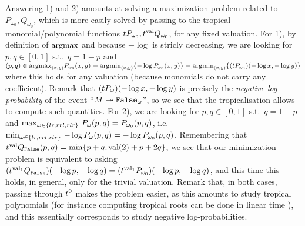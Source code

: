 Answering 1) and 2) amounts at solving a maximization problem related to $P_{\omega_0}, Q_{\omega_0}$, which is more easily solved by 
passing to the tropical monomial/polynomial functions $\trop P_{\omega_0},\trop^{\mathrm{val}} Q_{\omega_0}$, for any fixed valuation.
For 1), by definition of $\mathrm{arg max}$ and because $-\log$ is stricly decreasing, we are looking for $p,q\in[0,1]$ s.t.\ $q=1-p$ and $(p,q)\in
   \RM{arg max}_{(x,y)} P_{\omega_0} (x,y)
   = %
   \RM{arg min}_{(x,y)}\set{-\log P_{\omega_0} (x,y)}
   =%
   \RM{arg min}_{(x,y)}\set{(\trop P_{\omega_0}) (-\log x,-\log y)} \label{eq:argmax}$
where this holds for any valuation (because monomials do not carry any coefficient).
Remark that $(\trop P_{\omega})( -\log x, -\log y)$ is precisely the \emph{negative log-probability} of the event ``$M\twoheadrightarrow \mathtt{False}_{\omega}$'', so we see that the tropicalisation allows to compute such quantities.
For 2), %
we are looking for $p,q\in[0,1]$ s.t.\ $q=1-p$ and
$\max_{\omega\in\{lr,rrl,rlr\}} \, P_\omega(p,q) = P_{\omega_0}(p,q)$, i.e.\ $\min_{\omega\in\{lr,rrl,rlr\}} \, -\log P_\omega(p,q) = -\log P_{\omega_0}(p,q)$.
Remembering that $\trop^{\mathrm{val}} Q_{\false}(p,q)=\min\set{p+q, \mathrm{val}(2)+p+2q}$, we see that our minimization problem is equivalent to asking $(\trop^{\mathrm{val}_1} Q_{\false})( -\log p, -\log q) = (\trop^{\mathrm{val}_1} P_{\omega_0})( -\log p, -\log q)\label{eq:max}$,
and this time this holds, in general, only for the trivial valuation.
Remark that, in both cases, passing through $\trop^0 $ %
makes the problem easier, as this amounts to study tropical polynomials (for instance computing tropical roots can be done in linear time \cite{Noferini2lr5}), and this essentially corresponds to study negative log-probabilities. %



